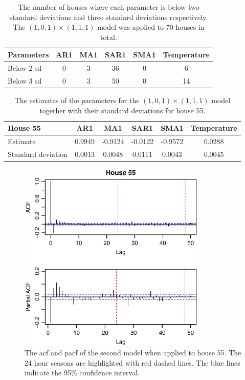 \begin{table}[]
    \centering
    \begin{tabular}{l|ccccc}
    \hline
    \textbf{Parameters} & \textbf{AR1} & \textbf{MA1} & \textbf{SAR1} & \textbf{SMA1} & \textbf{Temperature} \\ \hline \hline
    Below 2 sd & 0   & 3   & 36   & 0    & 6           \\
    Below 3 sd & 0   & 3   & 50   & 0    & 14          \\ \hline
    \end{tabular}
    \caption{The number of houses where each parameter is below two standard deviations and three standard deviations respectively. The $(1,0,1)\times (1,1,1)$ model was applied to $70$ houses in total.}
    \label{tab:ParamSig_Model1}
\end{table}

\begin{table}[]
    \centering
    \begin{tabular}{l|ccccc}
    \hline
    \textbf{House 55} & \textbf{AR1} & \textbf{MA1} & \textbf{SAR1} & \textbf{SMA1} & \textbf{Temperature} \\ \hline \hline
    Estimate           & 0.9949 & -0.9124 & -0.0122 & -0.9572 & 0.0288      \\
    Standard deviation & 0.0013 & 0.0048  & 0.0111  & 0.0043  & 0.0045      \\ \hline
    \end{tabular}
    \caption{The estimates of the parameters for the $(1,0,1)\times (1,1,1)$ model together with their standard deviations for house 55.}
    \label{tab:ParamSig_House55}
 \end{table}

 \begin{figure}
    \centering
    \includegraphics[width=0.8\textwidth]{../../../figures/arimax/ACF_55_short.eps}
    \caption{The acf and pacf of the second model when applied to house 55. The 24 hour seasons are highlighted with red dashed lines. The blue lines indicate the 95\% confidence interval.}
    \label{fig:Model2_acf_55}
\end{figure}


